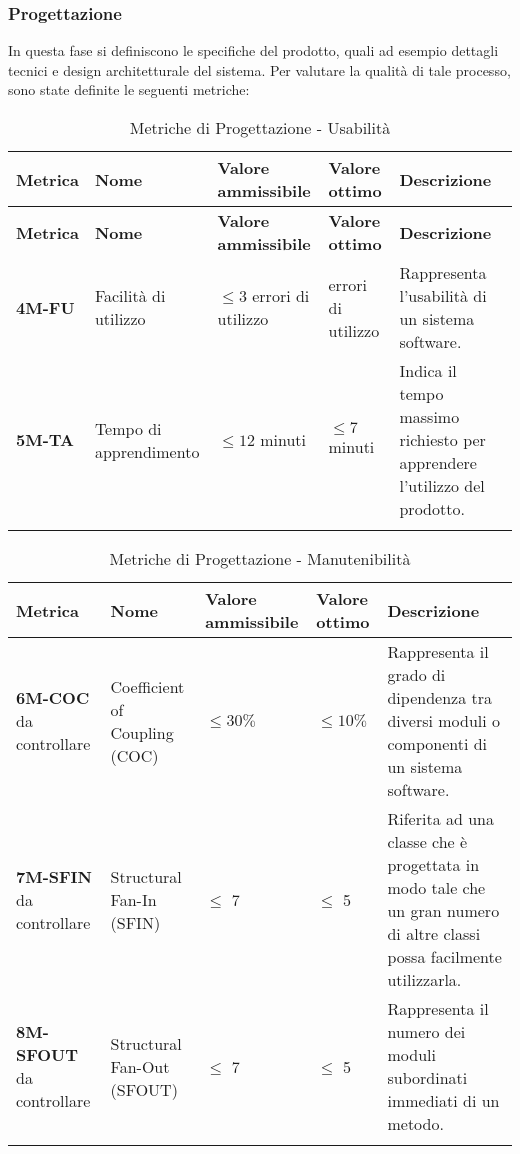 \subsubsection{Progettazione}
In questa fase si definiscono le specifiche del prodotto, quali ad esempio dettagli tecnici e design architetturale del sistema.
Per valutare la qualità di tale processo, sono state definite le seguenti metriche:
\begin{longtable}{|>{\raggedright\arraybackslash}m{}|>{\raggedright\arraybackslash}m{}|>{\raggedright\arraybackslash}m{}|>{\raggedright\arraybackslash}m{}|>{\raggedright\arraybackslash}m{}|}
	\hline
	\textbf{Metrica} & \textbf{Nome} & \textbf{Valore ammissibile} & \textbf{Valore ottimo} & \textbf{Descrizione}\\
	\hline
	\endfirsthead
	\hline
	\textbf{Metrica} & \textbf{Nome} & \textbf{Valore ammissibile} & \textbf{Valore ottimo} & \textbf{Descrizione}\\
	\endhead
	\textbf{4M-FU}   & Facilità di utilizzo   & $\leq 3 $ errori di utilizzo & 0 errori di utilizzo   & Rappresenta l'usabilità di un sistema software.                           \\
	\hline
	\textbf{5M-TA}   & Tempo di apprendimento & $\leq 12 $ minuti & $\leq 7 $ minuti & Indica il tempo massimo richiesto per apprendere l'utilizzo del prodotto. \\
	\hline
	\caption{Metriche di Progettazione - Usabilità}
	\label{table:2}
\end{longtable}

\begin{longtable}{|>{\raggedright\arraybackslash}m{}|>{\raggedright\arraybackslash}m{}|>{\raggedright\arraybackslash}m{}|>{\raggedright\arraybackslash}m{}|>{\raggedright\arraybackslash}m{}|}
	\hline
	\textbf{Metrica} & \textbf{Nome} & \textbf{Valore ammissibile} & \textbf{Valore ottimo} & \textbf{Descrizione}\\
	\hline
	\endfirsthead
	\hline
	\textbf{6M-COC} da controllare & Coefficient of Coupling (COC) & $\leq 30\% $ & $\leq 10\% $ & Rappresenta il grado di dipendenza tra diversi moduli o componenti di un sistema software. \\
	\hline
	\textbf{7M-SFIN} da controllare & Structural Fan-In (SFIN) & $\leq$ 7 & $\le$ 5 & Riferita ad una classe che è progettata in modo tale che un gran numero di altre classi possa facilmente utilizzarla. \\
	\hline
	\textbf{8M-SFOUT} da controllare & Structural Fan-Out (SFOUT) & $\leq$ 7 & $\le$ 5 & Rappresenta il numero dei moduli subordinati immediati di un metodo. \\
	\hline 
	\caption{Metriche di Progettazione - Manutenibilità}
	\label{table:3}
\end{longtable}

